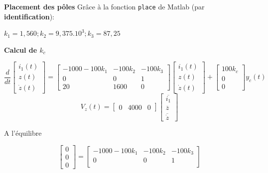 {{{\textbf{Placement des pôles} \newline
Grâce à la fonction \texttt{place} de Matlab (par \textbf{identification}): 
\begin{center}
    \large{$
    k_{1} = 1,560; k_{2} = 9,375.10^{3}; k_{3} = 87,25
    $}
\end{center}
\newpage
\textbf{Calcul de $k_{c}$}
\begin{center}
    \[
    \frac{d}{dt}
    \begin{bmatrix}
    i_{1}(t) \\
    z(t) \\
    \dot{z}(t)    
    \end{bmatrix}
    =
    \begin{bmatrix}
        -1000-100k_{1} & -100k_{2}  & -100k_{3} \\
        0              & 0          & 1         \\
        20             & 1600       & 0
    \end{bmatrix}
    \begin{bmatrix}
        i_{1}(t) \\
        z(t) \\
        \dot{z}(t)    
    \end{bmatrix}
    +
    \begin{bmatrix}
        100k_{c} \\
        0 \\
        0
    \end{bmatrix}
    y_{c}(t)
    \] \newline
    \[
    V_{z}(t) = 
    \begin{bmatrix}
        0 & 4000 & 0
    \end{bmatrix}
    \begin{bmatrix}
        \overline{i_{1}} \\
        \overline{z} \\
        \overline{\dot{z}}   
    \end{bmatrix}
    \]
\end{center}
A l'équilibre
\begin{center}
    \[
    \begin{bmatrix}
    0 \\
    0 \\
    0    
    \end{bmatrix}
    =
    \begin{bmatrix}
        -1000-100k_{1} & -100k_{2}  & -100k_{3} \\
        0              & 0          & 1         \\

\end{bmatrix}\]
\end{center}}}}
